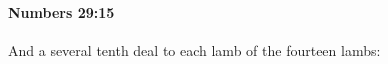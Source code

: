 
		\paragraph{Numbers 29:15} %
			\label{NUMBERS-29-15}

			And a several tenth deal to each lamb of the fourteen lambs:


